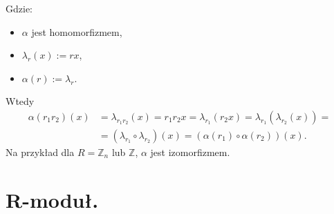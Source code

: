 \begin{enumerate}[label=\arabic*)]
\begin{figure}[H] %
        \centering
\end{figure}

Gdzie:
\begin{itemize}
	\item $\alpha $ jest homomorfizmem,
	\item $\lambda_{r}\left( x \right) := rx$,
	\item $\alpha \left( r \right) := \lambda_{r}$.
\end{itemize}
Wtedy
\begin{align*}
	\alpha \left( r_1r_2 \right) \left( x \right) &= \lambda_{r_1r_2}\left( x \right) = r_1r_2x = \lambda_{r_1}\left( r_2x \right) = \lambda_{r_1}\left( \lambda_{r_2}\left( x \right)  \right) = \\
		       &= \left( \lambda_{r_1}\circ \lambda_{r_2} \right) \left( x \right) = \left( \alpha \left( r_1 \right) \circ \alpha \left( r_2 \right)  \right) \left( x \right)  
.\end{align*}
Na przykład dla $R = \mathbb{Z} _{n}$ lub $\mathbb{Z} $, $\alpha $ jest izomorfizmem.
\end{enumerate}
\section{R-moduł.}

